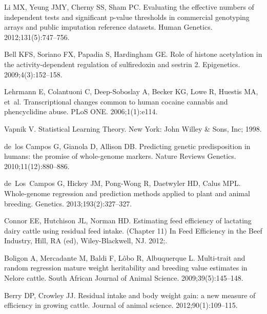 \documentclass[10pt,letterpaper]{article}
\begin{document}
\begin{thebibliography}{10}
Li MX, Yeung JMY, Cherny SS, Sham PC.
\newblock Evaluating the effective numbers of independent tests and significant
  p-value thresholds in commercial genotyping arrays and public imputation
  reference datasets.
\newblock Human Genetics. 2012;131(5):747--756.

Bell KFS, Soriano FX, Papadia S, Hardingham GE.
\newblock Role of histone acetylation in the activity-dependent regulation of
  sulfiredoxin and sestrin 2.
\newblock Epigenetics. 2009;4(3):152--158.

Lehrmann E, Colantuoni C, Deep-Soboslay A, Becker KG, Lowe R, Huestis MA,
  et~al.
\newblock Transcriptional changes common to human cocaine cannabis and
  phencyclidine abuse.
\newblock PLoS ONE. 2006;1(1):e114.

Vapnik V.
\newblock Statistical Learning Theory.
\newblock New York: John Willey \& Sons, Inc; 1998.

de~los Campos G, Gianola D, Allison DB.
\newblock Predicting genetic predisposition in humans: the promise of
  whole-genome markers.
\newblock Nature Reviews Genetics. 2010;11(12):880--886.

de~Los~Campos G, Hickey JM, Pong-Wong R, Daetwyler HD, Calus MPL.
\newblock Whole-genome regression and prediction methods applied to plant and
  animal breeding.
\newblock Genetics. 2013;193(2):327--327.

Connor EE, Hutchison JL, Norman HD.
\newblock Estimating feed efficiency of lactating dairy cattle using residual
  feed intake.
\newblock (Chapter 11) In Feed Efficiency in the Beef Industry, Hill, RA (ed),
  Wiley-Blackwell, NJ. 2012;.

Boligon A, Mercadante M, Baldi F, L\^{o}bo R, Albuquerque L.
\newblock Multi-trait and random regression mature weight heritability and
  breeding value estimates in Nelore cattle.
\newblock South African Journal of Animal Science. 2009;39(5):145--148.

Berry DP, Crowley JJ.
\newblock Residual intake and body weight gain: a new measure of efficiency in
  growing cattle.
\newblock Journal of animal science. 2012;90(1):109--115.

\end{thebibliography}


%
\end{document}
